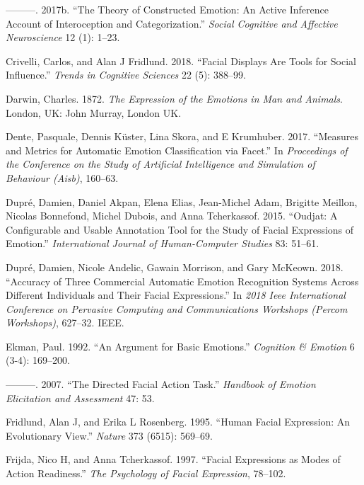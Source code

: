 \documentclass[conference,final,]{IEEEtran}
\begin{document}
\leavevmode\hypertarget{ref-barrett2017theory}{}%
---------. 2017b. ``The Theory of Constructed Emotion: An Active
Inference Account of Interoception and Categorization.'' \emph{Social
Cognitive and Affective Neuroscience} 12 (1): 1--23.

\leavevmode\hypertarget{ref-crivelli2018facial}{}%
Crivelli, Carlos, and Alan J Fridlund. 2018. ``Facial Displays Are Tools
for Social Influence.'' \emph{Trends in Cognitive Sciences} 22 (5):
388--99.

\leavevmode\hypertarget{ref-darwin1872expression}{}%
Darwin, Charles. 1872. \emph{The Expression of the Emotions in Man and
Animals}. London, UK: John Murray, London UK.

\leavevmode\hypertarget{ref-dente2017measures}{}%
Dente, Pasquale, Dennis Küster, Lina Skora, and E Krumhuber. 2017.
``Measures and Metrics for Automatic Emotion Classification via Facet.''
In \emph{Proceedings of the Conference on the Study of Artificial
Intelligence and Simulation of Behaviour (Aisb)}, 160--63.

\leavevmode\hypertarget{ref-dupre2015oudjat}{}%
Dupré, Damien, Daniel Akpan, Elena Elias, Jean-Michel Adam, Brigitte
Meillon, Nicolas Bonnefond, Michel Dubois, and Anna Tcherkassof. 2015.
``Oudjat: A Configurable and Usable Annotation Tool for the Study of
Facial Expressions of Emotion.'' \emph{International Journal of
Human-Computer Studies} 83: 51--61.

\leavevmode\hypertarget{ref-dupre2018accuracy}{}%
Dupré, Damien, Nicole Andelic, Gawain Morrison, and Gary McKeown. 2018.
``Accuracy of Three Commercial Automatic Emotion Recognition Systems
Across Different Individuals and Their Facial Expressions.'' In
\emph{2018 Ieee International Conference on Pervasive Computing and
Communications Workshops (Percom Workshops)}, 627--32. IEEE.

\leavevmode\hypertarget{ref-ekman1992argument}{}%
Ekman, Paul. 1992. ``An Argument for Basic Emotions.'' \emph{Cognition
\& Emotion} 6 (3-4): 169--200.

\leavevmode\hypertarget{ref-ekman2007directed}{}%
---------. 2007. ``The Directed Facial Action Task.'' \emph{Handbook of
Emotion Elicitation and Assessment} 47: 53.

\leavevmode\hypertarget{ref-fridlund1995human}{}%
Fridlund, Alan J, and Erika L Rosenberg. 1995. ``Human Facial
Expression: An Evolutionary View.'' \emph{Nature} 373 (6515): 569--69.

\leavevmode\hypertarget{ref-frijda1997facial}{}%
Frijda, Nico H, and Anna Tcherkassof. 1997. ``Facial Expressions as
Modes of Action Readiness.'' \emph{The Psychology of Facial Expression},
78--102.
\end{document}
